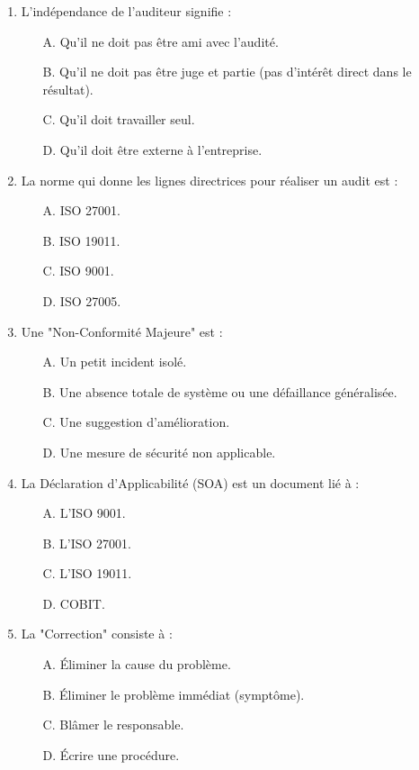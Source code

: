\begin{enumerate}
    \item L'indépendance de l'auditeur signifie :
    \begin{itemize}
        \item[A.] Qu'il ne doit pas être ami avec l'audité.
        \item[B.] Qu'il ne doit pas être juge et partie (pas d'intérêt direct dans le résultat).
        \item[C.] Qu'il doit travailler seul.
        \item[D.] Qu'il doit être externe à l'entreprise.
    \end{itemize}

    \item La norme qui donne les lignes directrices pour réaliser un audit est :
    \begin{itemize}
        \item[A.] ISO 27001.
        \item[B.] ISO 19011.
        \item[C.] ISO 9001.
        \item[D.] ISO 27005.
    \end{itemize}

    \item Une "Non-Conformité Majeure" est :
    \begin{itemize}
        \item[A.] Un petit incident isolé.
        \item[B.] Une absence totale de système ou une défaillance généralisée.
        \item[C.] Une suggestion d'amélioration.
        \item[D.] Une mesure de sécurité non applicable.
    \end{itemize}

    \item La Déclaration d'Applicabilité (SOA) est un document lié à :
    \begin{itemize}
        \item[A.] L'ISO 9001.
        \item[B.] L'ISO 27001.
        \item[C.] L'ISO 19011.
        \item[D.] COBIT.
    \end{itemize}

    \item La "Correction" consiste à :
    \begin{itemize}
        \item[A.] Éliminer la cause du problème.
        \item[B.] Éliminer le problème immédiat (symptôme).
        \item[C.] Blâmer le responsable.
        \item[D.] Écrire une procédure.
    \end{itemize}


\end{enumerate}
